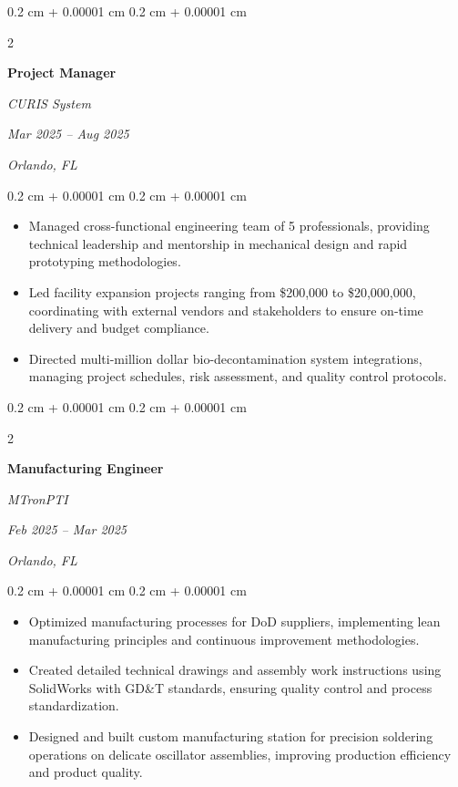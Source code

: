 \documentclass[10pt, letterpaper]{article}
\newenvironment{highlights}{
    \begin{itemize}[
        topsep=0.10 cm,
        parsep=0.10 cm,
        partopsep=0pt,
        itemsep=0pt,
        leftmargin=0.4 cm + 10pt
    ]
}{
    \end{itemize}
} %
\newenvironment{onecolentry}{
    \begin{adjustwidth}{
        0.2 cm + 0.00001 cm
    }{
        0.2 cm + 0.00001 cm
    }
}{
    \end{adjustwidth}
} %
\newenvironment{twocolentry}[2][]{
    \onecolentry
    \def\secondColumn{#2}
    \setcolumnwidth{\fill, 5.0 cm}
    \begin{paracol}{2}
}{
    \switchcolumn \raggedleft \secondColumn
    \end{paracol}
    \endonecolentry
} %
\begin{document}
        \vspace{0.35 cm}

        \begin{twocolentry}{
        \textit{Mar 2025 – Aug 2025}
        
        \textit{Orlando, FL}}
            \textbf{Project Manager}
            
            \textit{CURIS System}
        \end{twocolentry}

        \vspace{0.10 cm}
        \begin{onecolentry}
            \begin{highlights}
                \item Managed cross-functional engineering team of 5 professionals, providing technical leadership and mentorship in mechanical design and rapid prototyping methodologies.
                \item Led facility expansion projects ranging from \$200,000 to \$20,000,000, coordinating with external vendors and stakeholders to ensure on-time delivery and budget compliance.
                \item Directed multi-million dollar bio-decontamination system integrations, managing project schedules, risk assessment, and quality control protocols.
            \end{highlights}
        \end{onecolentry}

        \vspace{0.35 cm}

        
        \begin{twocolentry}{
        \textit{Feb 2025 – Mar 2025}
        
        \textit{Orlando, FL}}
            \textbf{Manufacturing Engineer}
            
            \textit{MTronPTI}
        \end{twocolentry}

        \vspace{0.10 cm}
        \begin{onecolentry}
            \begin{highlights}
                \item Optimized manufacturing processes for DoD suppliers, implementing lean manufacturing principles and continuous improvement methodologies.
                \item Created detailed technical drawings and assembly work instructions using SolidWorks with GD\&T standards, ensuring quality control and process standardization.
                \item Designed and built custom manufacturing station for precision soldering operations on delicate oscillator assemblies, improving production efficiency and product quality.
            \end{highlights}
        \end{onecolentry}
\end{document}
